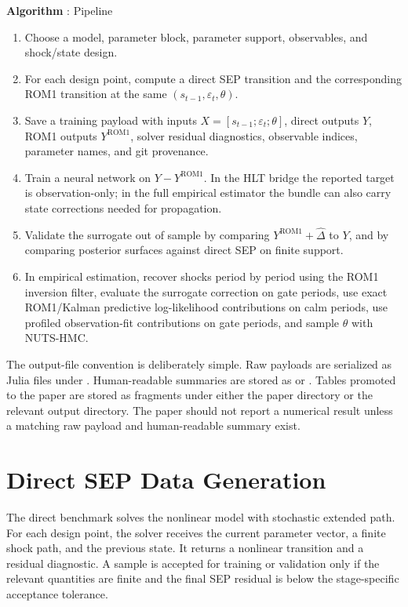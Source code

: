 \documentclass[12pt]{article}
\newcommand{\eps}{\varepsilon}
\newcommand{\rom}{\mathrm{ROM1}}
\newcounter{algorithm}
\newenvironment{algorithm}[1][]{%
  \refstepcounter{algorithm}%
  \par\medskip\noindent
  \textbf{Algorithm \thealgorithm}\if\relax\detokenize{#1}\relax\else: #1\fi
  \par\smallskip
  \begin{enumerate}[leftmargin=2.2em,itemsep=0.25em]
}{%
  \end{enumerate}
  \par\medskip
}
\begin{document}
\begin{algorithm}[Pipeline]
\item Choose a model, parameter block, parameter support, observables, and
      shock/state design.
\item For each design point, compute a direct SEP transition and the
      corresponding ROM1 transition at the same
      \((s_{t-1},\eps_t,\theta)\).
\item Save a training payload with inputs
      \(X=[s_{t-1};\eps_t;\theta]\), direct outputs \(Y\), ROM1 outputs
      \(Y^{\rom}\), solver residual diagnostics, observable indices, parameter
      names, and git provenance.
\item Train a neural network on \(Y-Y^{\rom}\). In the HLT bridge the reported
      target is observation-only; in the full empirical estimator the bundle can
      also carry state corrections needed for propagation.
\item Validate the surrogate out of sample by comparing
      \(Y^{\rom}+\widehat{\Delta}\) to \(Y\), and by comparing posterior
      surfaces against direct SEP on finite support.
\item In empirical estimation, recover shocks period by period using the ROM1
      inversion filter, evaluate the surrogate correction on gate periods, use
      exact ROM1/Kalman predictive log-likelihood contributions on calm
      periods, use profiled observation-fit contributions on gate periods, and
      sample \(\theta\) with NUTS-HMC.
\end{algorithm}

The output-file convention is deliberately simple. Raw payloads are serialized
as Julia  files under . Human-readable
summaries are stored as  or . Tables
promoted to the paper are stored as  fragments under either the paper
directory or the relevant output directory. The paper should not report a
numerical result unless a matching raw payload and human-readable summary exist.

\section{Direct SEP Data Generation}
\label{apptech:sep_generation}

The direct benchmark solves the nonlinear model with stochastic extended path.
For each design point, the solver receives the current parameter vector, a
finite shock path, and the previous state. It returns a nonlinear transition
and a residual diagnostic. A sample is accepted for training or validation only
if the relevant quantities are finite and the final SEP residual is below the
stage-specific acceptance tolerance.
\end{document}
